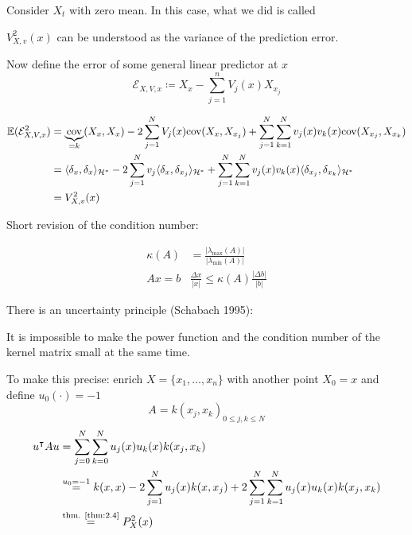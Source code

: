 Consider $X_t$ with zero mean. In this case, what we did is called 

$V_{X,v}^2(x)$ can be understood as the variance of the prediction error.

Now define the error of some general linear predictor at $x$
\[\mathcal{E}_{X,V,x}\coloneqq X_x-\sum_{j=1}^n V_j(x)X_{x_j}\] %


\begin{align*}
    \mathbb{E}(\mathcal{E}_{X,V,x}^2)&=\underbrace{\text{cov}}_{=k}(X_x,X_x)-2\sum_{j=1}^N V_j(x)\text{cov}(X_x,X_{x_j})+\sum_{j=1}^N\sum_{k=1}^N v_j(x)v_k(x)\text{cov}(X_{x_j},X_{x_k})\\
    &=\langle \delta_x, \delta_x\rangle_{\mathcal{H}^*}-2\sum_{j=1}^{N}v_j\langle \delta_x,\delta_{x_j}\rangle_{\mathcal{H}^*}+\sum_{j=1}^{N}\sum_{k=1}^N v_j(x)v_k(x)\langle \delta_{x_j},\delta_{x_k}\rangle_{\mathcal{H}^*}\\
    &=V_{X,v}^2(x)
\end{align*}

Short revision of the condition number:

\begin{align*}
    \kappa(A)&=\frac{|\lambda_{\max} (A)|}{|\lambda_{\min} (A)|}\\
    Ax=b & \frac{\Delta x}{|x|}\leq \kappa(A)\frac{|\Delta b|}{|b|}
\end{align*}


There is an uncertainty principle (Schabach 1995):

It is impossible to make the power function and the condition number 
of the kernel matrix small at the same time. 

To make this precise: enrich $X=\{x_1,\dots,x_n\}$ with another point $X_0=x$
and define $u_0(\cdot)=-1$
\[A=k(x_j,x_k)_{0\leq j,k\leq N}\]
\begin{align*}
    u^\intercal A u&=\sum_{j=0}^N\sum_{k=0}^N u_j(x)u_k(x)k(x_j,x_k)\\
    &\stackrel{u_0=-1}{=}k(x,x)-2\sum_{j=1}^Nu_j(x)k(x,x_j)+2\sum_{j=1}^N\sum_{k=1}^Nu_j(x)u_k(x)k(x_j,x_k)\\
    &\stackrel{\text{thm. \ref{thm:2.4}}}{=}P_X^2(x)
\end{align*}

